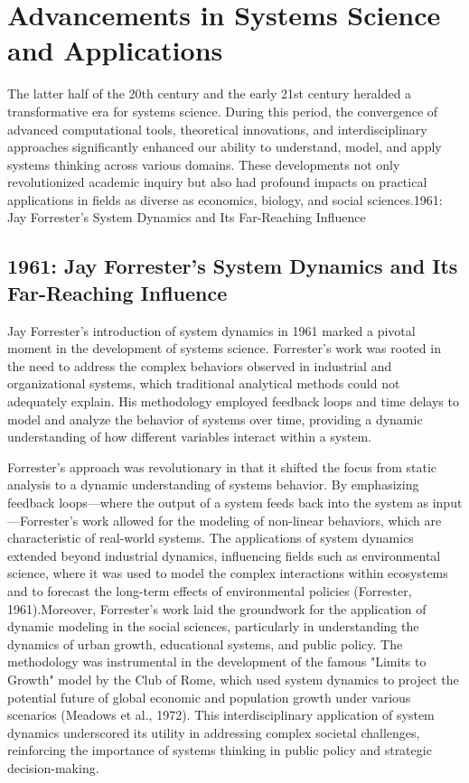 \documentclass[twocolumn]{article}
\begin{document}
\section{Advancements in Systems Science and Applications}

\textcolor{primary}{The latter half of the 20th century and the early 21st century heralded a transformative era for systems science. During this period, the convergence of advanced computational tools, theoretical innovations, and interdisciplinary approaches significantly enhanced our ability to understand, model, and apply systems thinking across various domains. These developments not only revolutionized academic inquiry but also had profound impacts on practical applications in fields as diverse as economics, biology, and social sciences.1961: Jay Forrester’s System Dynamics and Its Far-Reaching Influence}

\subsection{1961: Jay Forrester’s System Dynamics and Its Far-Reaching Influence}

\textcolor{primary}{Jay Forrester’s introduction of system dynamics in 1961 marked a pivotal moment in the development of systems science. Forrester’s work was rooted in the need to address the complex behaviors observed in industrial and organizational systems, which traditional analytical methods could not adequately explain. His methodology employed feedback loops and time delays to model and analyze the behavior of systems over time, providing a dynamic understanding of how different variables interact within a system.}

\textcolor{secondary}{Forrester’s approach was revolutionary in that it shifted the focus from static analysis to a dynamic understanding of systems behavior. By emphasizing feedback loops—where the output of a system feeds back into the system as input—Forrester's work allowed for the modeling of non-linear behaviors, which are characteristic of real-world systems. The applications of system dynamics extended beyond industrial dynamics, influencing fields such as environmental science, where it was used to model the complex interactions within ecosystems and to forecast the long-term effects of environmental policies (Forrester, 1961).Moreover, Forrester’s work laid the groundwork for the application of dynamic modeling in the social sciences, particularly in understanding the dynamics of urban growth, educational systems, and public policy. The methodology was instrumental in the development of the famous "Limits to Growth" model by the Club of Rome, which used system dynamics to project the potential future of global economic and population growth under various scenarios (Meadows et al., 1972). This interdisciplinary application of system dynamics underscored its utility in addressing complex societal challenges, reinforcing the importance of systems thinking in public policy and strategic decision-making.}
\end{document}
